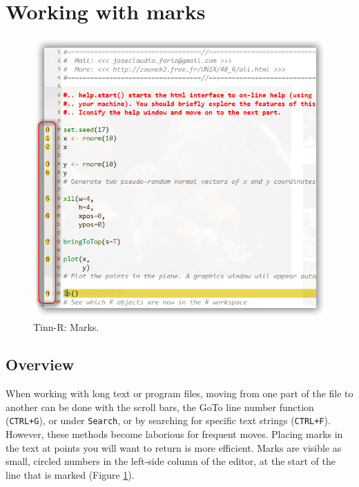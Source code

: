 
\hypertarget{working_marks}{}
\section{Working with marks}

\begin{figure}[H]
  \begin{center}
    \includegraphics[scale=0.60]{./res/marks.png}
  \end{center}
  \caption{Tinn-R: Marks.}
  \label{fig:tinn-r_marks}
\end{figure}

\subsection{Overview}
When working with long text or program files, moving from one part of the file to another can
be done with the scroll bars, the GoTo line number function (\texttt{CTRL+G}), or under \texttt{Search},
or by searching for specific text strings (\texttt{CTRL+F}).
However, these methods become laborious for frequent moves.
Placing marks in the text at points you will want to return is more efficient.
Marks are visible as small, circled numbers in the left-side column of the editor,
at the start of the line that is marked (Figure \ref{fig:tinn-r_marks}).

